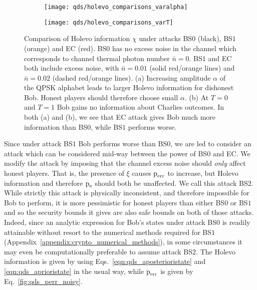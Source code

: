 \begin{figure}[htp]
\captionsetup{width=0.8\linewidth}
\centering
	\begin{subfigure}{0.49\linewidth}
		\centering
		\caption{\label{fig:qds_holevo_comparisons_varalpha}}
		\texttt{[image: qds/holevo\_comparisons\_varalpha]}
	\end{subfigure}
	\begin{subfigure}{0.49\linewidth}
		\centering
		\caption{\label{fig:qds_holevo_comparisons_varT}}
		\texttt{[image: qds/holevo\_comparisons\_varT]}	
	\end{subfigure}
	\caption{\label{fig:qds_holevo_comparisons} Comparison of Holevo information $\chi$ under attacks BS$0$ (black), BS$1$ (orange) and EC (red). BS$0$ has no excess noise in the channel which corresponds to channel thermal photon number $\bar{n} = 0$. BS$1$ and EC both include excess noise, with $\bar{n} = 0.01$ (solid red/orange lines) and $\bar{n} = 0.02$ (dashed red/orange lines). (a) Increasing amplitude $\alpha$ of the QPSK alphabet leads to larger Holevo information for dishonest Bob. Honest players should therefore choose small $\alpha$. (b) At $T=0$ and $T=1$ Bob gains no information about Charlies outcomes. In both (a) and (b), we see that EC attack gives Bob much more information than BS$0$, while BS$1$ performs worse.}
\end{figure}

Since under attack BS$1$ Bob performs worse than BS$0$, we are led to consider an attack which can be considered mid-way between the power of BS$0$ and EC. We modify the attack by imposing that the channel excess noise should \emph{only} affect honest players. That is, the presence of $\xi$ causes $\text{p}_{\text{err}}$ to increase, but Holevo information and therefore $\text{p}_{\text{e}}$ should both be unaffected. We call this attack BS$2$. While strictly this attack is physically inconsistent, and therefore impossible for Bob to perform, it is more pessimistic for honest players than either BS$0$ or BS$1$ and so the security bounds it gives are also safe bounds on both of those attacks. Indeed, since an analytic expression for Bob's states under attack BS$0$ is readily attainable without resort to the numerical methods required for BS$1$ (Appendix~\ref{appendix:crypto_numerical_methods}), in some circumstances it may even be computationally preferable to assume attack BS$2$. The Holevo information is given by using Eqs.~\ref{eqn:qds_aposterioristate} and \ref{eqn:qds_aprioristate} in the usual way, while $\text{p}_{\text{err}}$ is given by Eq.~\ref{fig:qds_perr_noisy}.


